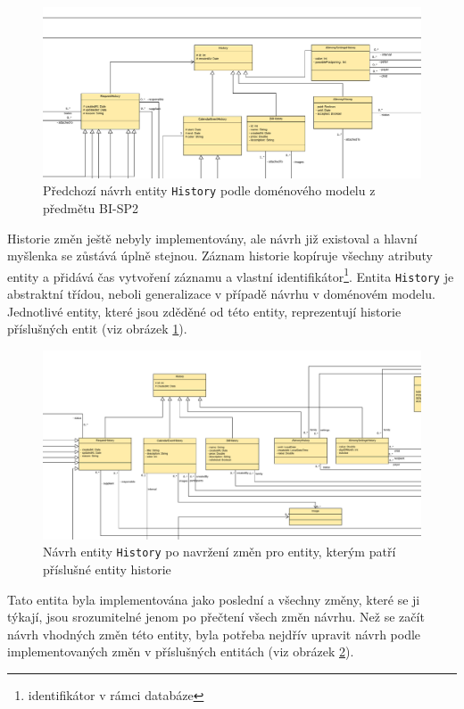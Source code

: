         \begin{figure}\centering
	        \includegraphics[width=1.0\textwidth]{pdfs/History1}
	        \caption[Předchozí návrh entity \texttt{History}]{Předchozí návrh entity \texttt{History} podle doménového modelu z předmětu BI-SP2}\label{image:History1}
        \end{figure}
        Historie změn ještě nebyly implementovány, ale návrh již existoval a hlavní myšlenka se zůstává úplně stejnou. Záznam historie kopíruje všechny atributy entity a přidává čas vytvoření záznamu a vlastní identifikátor\footnote{identifikátor v rámci databáze}. Entita \verb|History| je abstraktní třídou, neboli generalizace v případě návrhu v doménovém modelu. Jednotlivé entity, které jsou zděděné od této entity, reprezentují historie příslušných entit (viz obrázek \ref{image:History1}). 
    
        \begin{figure}\centering
	        \includegraphics[width=1.0\textwidth]{pdfs/History1_2}
	        \caption[Návrh entity \texttt{History} po změnách návrhu]{Návrh entity \texttt{History} po navržení změn pro entity, kterým patří příslušné entity historie}\label{image:History1_2}
        \end{figure}
        Tato entita byla implementována jako poslední a všechny změny, které se ji týkají, jsou srozumitelné jenom po přečtení všech změn návrhu. Než se začít návrh vhodných změn této entity, byla potřeba nejdřív upravit návrh podle implementovaných změn v příslušných entitách (viz obrázek \ref{image:History1_2}).
        
